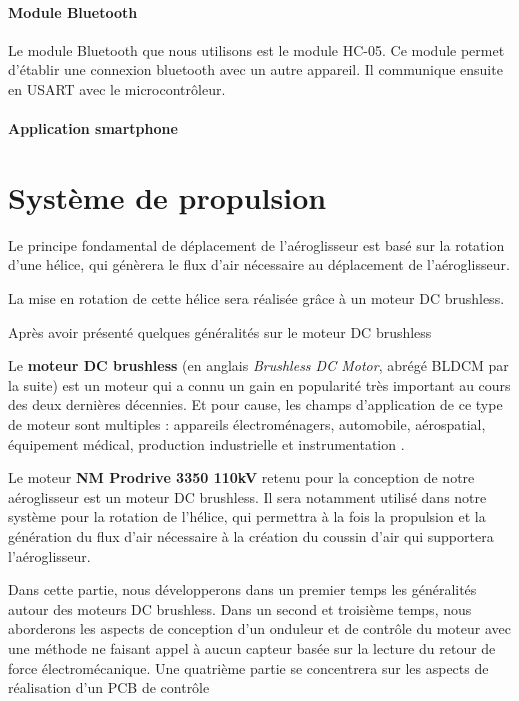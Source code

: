 \documentclass[a4paper,12pt]{book}
\begin{document}
			\subsubsection{Module Bluetooth}
			Le module Bluetooth que nous utilisons est le module HC-05. Ce module permet d'établir une connexion bluetooth avec un autre appareil. Il communique ensuite en USART avec le microcontrôleur.
			\subsubsection{Application smartphone}



	
	\chapter{Système de propulsion}

	Le principe fondamental de déplacement de l'aéroglisseur est basé sur la rotation d'une hélice, qui génèrera le flux d'air nécessaire au déplacement de l'aéroglisseur.
	
	La mise en rotation de cette hélice sera réalisée grâce à un moteur DC brushless. 
	
	Après avoir présenté quelques généralités sur le moteur DC  brushless
		
	Le \textbf{moteur DC brushless} (en anglais \textit{Brushless DC Motor}, abrégé BLDCM par la suite) est un moteur qui a connu un gain en popularité très important au cours des deux dernières décennies. Et pour cause, les champs d'application de ce type de moteur sont multiples : appareils électroménagers, automobile, aérospatial, équipement médical, production industrielle et instrumentation \cite{AN885}. 
			
	Le moteur \textbf{NM Prodrive 3350 110kV} retenu pour la conception de notre aéroglisseur est un moteur DC brushless. Il sera notamment utilisé dans notre système pour la rotation de l'hélice, qui permettra à la fois la propulsion et la génération du flux d'air nécessaire à la création du coussin d'air qui supportera l'aéroglisseur.
			
	Dans cette partie, nous développerons dans un premier temps les généralités autour des moteurs DC brushless. Dans un second et troisième temps, nous aborderons les aspects de conception d'un onduleur et de contrôle du moteur avec une méthode ne faisant appel à aucun capteur basée sur la lecture du retour de force électromécanique. Une quatrième partie se concentrera sur les aspects de réalisation d'un PCB de contrôle 
			
\end{document}
